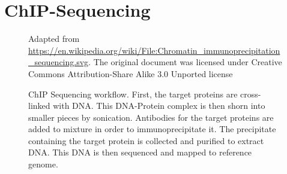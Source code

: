 \documentclass[parskip]{cs4rep}
\begin{document}
\section{ChIP-Sequencing}
\label{sec:chip}

\begin{figure}
\centering
{}
{Adapted from \url{https://en.wikipedia.org/wiki/File:Chromatin_immunoprecipitation_sequencing.svg}.
The original document was licensed under Creative Commons Attribution-Share Alike 3.0 Unported license}
\caption{ChIP Sequencing workflow. First, the target proteins are cross-linked with DNA. This DNA-Protein complex is then shorn into smaller pieces by sonication. Antibodies for the target proteins are added to mixture in order to immunoprecipitate it. The precipitate containing the target protein is collected and purified to extract DNA. This DNA is then sequenced and mapped to reference genome.
}
\label{fig:background:chip}
\end{figure}
\end{document}
